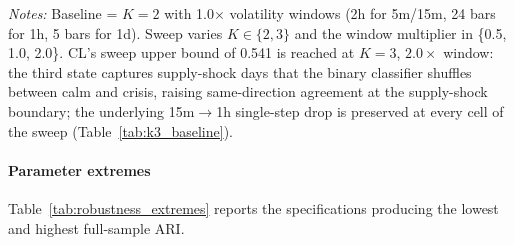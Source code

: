 \documentclass[preprint,12pt,authoryear]{elsarticle}
\newcommand{\CL}{CL}
\begin{document}
\begin{table}[!htbp]
\centering
\small
\setlength{\tabcolsep}{4pt}
\caption{Robustness to alternative $K$ and rolling-volatility windows.}
\label{tab:robustness}
\par\medskip
{\footnotesize\justifying
\textit{Notes:} Baseline = $K{=}2$ with 1.0$\times$ volatility windows (2h for 5m/15m, 24 bars for 1h, 5 bars for 1d). Sweep varies $K \in \{2,3\}$ and the window multiplier in \{0.5, 1.0, 2.0\}. \CL{}'s sweep upper bound of 0.541 is reached at $K{=}3$, $2.0\times$ window: the third state captures supply-shock days that the binary classifier shuffles between calm and crisis, raising same-direction agreement at the supply-shock boundary; the underlying 15m$\to$1h single-step drop is preserved at every cell of the sweep (Table~\ref{tab:k3_baseline}).
\par}
\end{table}

\paragraph{Parameter extremes}
Table~\ref{tab:robustness_extremes} reports the specifications producing the lowest and highest full-sample ARI.
\end{document}
